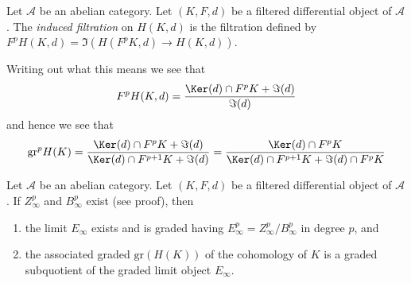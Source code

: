 \begin{definition}
\label{definition-filtration-cohomology-filtered-differential}
Let $\mathcal{A}$ be an abelian category.
Let $(K, F, d)$ be a filtered differential object of $\mathcal{A}$.
The {\it induced filtration} on $H(K, d)$ is the filtration defined
by $F^pH(K, d) = \Im(H(F^pK, d) \to H(K, d))$.
\end{definition}

\noindent
Writing out what this means we see that
$$
F^pH(K, d) =
\frac{\Ker(d) \cap F^pK + \Im(d)}{\Im(d)}
$$
and hence we see that
$$
\text{gr}^p H(K) =
\frac{\Ker(d) \cap F^pK + \Im(d)}{\Ker(d) \cap F^{p + 1}K + \Im(d)} =
\frac{\Ker(d) \cap F^pK}{\Ker(d) \cap F^{p + 1}K + \Im(d) \cap F^pK}
$$

\begin{lemma}
\label{lemma-compute-filtered-cohomology}
Let $\mathcal{A}$ be an abelian category. Let $(K, F, d)$ be a filtered
differential object of $\mathcal{A}$. If $Z_\infty^p$ and $B_\infty^p$
exist (see proof), then
\begin{enumerate}
\item the limit $E_\infty$ exists and is graded having
$E_\infty^p = Z_\infty^p/B_\infty^p$ in degree $p$, and
\item the associated graded $\text{gr}(H(K))$ of the cohomology of $K$
is a graded subquotient of the graded limit object $E_\infty$.
\end{enumerate}
\end{lemma}

